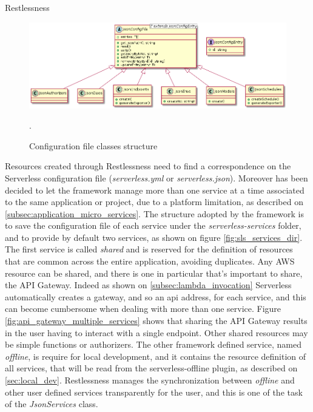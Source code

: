 \begin{chapter}{Restlessness}
    \begin{figure}
        \centering
        \includegraphics[width=\linewidth]{source/diagrams/rln_config_files.png}
        \caption{Configuration file classes structure}
        \label{fig:rln_json_config_file}.
    \end{figure}

    Resources created through Restlessness need to find a correspondence on the
    Serverless configuration file (\textit{serverless.yml} or \textit{serverless.json}).
    Moreover has been decided to let the framework manage more than one service at
    a time associated to the same application or project, due to a platform limitation,
    as described on \ref{subsec:application_micro_services}.
    The structure adopted by the framework is to save the configuration file of
    each service under the \textit{serverless-services} folder, and to provide by
    default two services, as shown on figure \ref{fig:sls_services_dir}.
    The first service is called \textit{shared} and is reserved for the definition
    of resources that are common across the entire application, avoiding duplicates.
    Any AWS resource can be shared, and there is one in particular that's important
    to share, the API Gateway. Indeed as shown on \ref{subsec:lambda_invocation}
    Serverless automatically creates a gateway, and so an api address, for each
    service, and this can become cumbersome when dealing with more than one service.
    Figure \ref{fig:api_gateway_multiple_services} shows that sharing the API
    Gateway results in the user having to interact with a single endpoint.
    Other shared resources may be simple functions or authorizers.
    The other framework defined service, named \textit{offline}, is require for
    local development, and it contains the resource definition of all services,
    that will be read from the serverless-offline plugin, as described on
    \ref{sec:local_dev}. Restlessness manages the synchronization between
    \textit{offline} and other user defined services transparently for the user,
    and this is one of the task of the \textit{JsonServices} class.


\end{chapter}
